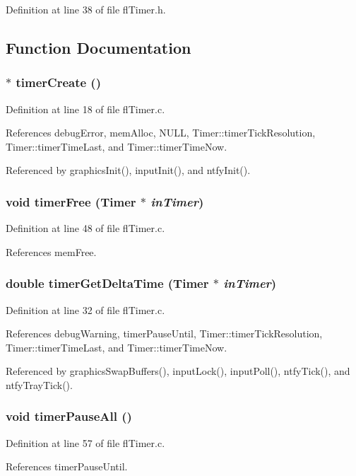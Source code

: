 Definition at line 38 of file fl\-Timer.h.

\subsection{Function Documentation}
\subsubsection{$\ast$ timer\-Create ()}\label{flTimer_8h_4081033c0b3db3af0897edf915431b73}




Definition at line 18 of file fl\-Timer.c.

References debug\-Error, mem\-Alloc, NULL, Timer::timer\-Tick\-Resolution, Timer::timer\-Time\-Last, and Timer::timer\-Time\-Now.

Referenced by graphics\-Init(), input\-Init(), and ntfy\-Init().
\subsubsection{\setlength{\rightskip}{0pt plus 5cm}void timer\-Free ({\bf Timer} $\ast$ {\em in\-Timer})}\label{flTimer_8h_725e9715b3a290861aab8af7146aa2b3}




Definition at line 48 of file fl\-Timer.c.

References mem\-Free.
\subsubsection{\setlength{\rightskip}{0pt plus 5cm}double timer\-Get\-Delta\-Time ({\bf Timer} $\ast$ {\em in\-Timer})}\label{flTimer_8h_154b34b0d32a2c77e90dc904a634fd59}




Definition at line 32 of file fl\-Timer.c.

References debug\-Warning, timer\-Pause\-Until, Timer::timer\-Tick\-Resolution, Timer::timer\-Time\-Last, and Timer::timer\-Time\-Now.

Referenced by graphics\-Swap\-Buffers(), input\-Lock(), input\-Poll(), ntfy\-Tick(), and ntfy\-Tray\-Tick().
\subsubsection{\setlength{\rightskip}{0pt plus 5cm}void timer\-Pause\-All ()}\label{flTimer_8h_944af842e6771f6d921f56381ec457ea}




Definition at line 57 of file fl\-Timer.c.

References timer\-Pause\-Until.